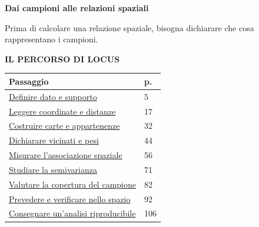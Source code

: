 \documentclass[12pt,aspectratio=1610]{beamer}
\newcommand{\PLabel}[1]{\par{\color{Classical}\bfseries\fontsize{9}{11}\selectfont\MakeUppercase{#1}}\par\vspace{1.8mm}}
\begin{document}
\begin{frame}[plain]\hypertarget{slide2}{}
\begin{lrbox}{\TitleBox}
\begin{minipage}[t]{17.7cm}\raggedright\color{Ink}\fontsize{11.3}{14.8}\selectfont
\color{Navy}\bfseries\fontsize{20.6}{24.5}\selectfont Dai campioni alle relazioni spaziali
\end{minipage}\end{lrbox}

\begin{lrbox}{\RecallBox}
\begin{minipage}[t]{14.3cm}\raggedright\color{Ink}\fontsize{11.3}{14.8}\selectfont
\fontsize{10.3}{13.8}\selectfont Prima di calcolare una relazione spaziale, bisogna dichiarare che cosa rappresentano i campioni.
\end{minipage}\end{lrbox}

\begin{lrbox}{\PilotLeftBox}
\begin{minipage}[t]{10.05cm}\raggedright\color{Ink}\fontsize{11.3}{14.8}\selectfont
\PLabel{Il percorso di Locus}
{\fontsize{10.2}{13.1}\selectfont\renewcommand{\arraystretch}{1.45}\begin{tabular}{@{}p{8.3cm}p{0.7cm}@{}}\toprule
\textbf{Passaggio} & \textbf{p.}\\\midrule
\hyperlink{slide5}{Definire dato e supporto} & 5\\
\hyperlink{slide17}{Leggere coordinate e distanze} & 17\\
\hyperlink{slide32}{Costruire carte e appartenenze} & 32\\
\hyperlink{slide44}{Dichiarare vicinati e pesi} & 44\\
\hyperlink{slide56}{Misurare l’associazione spaziale} & 56\\
\hyperlink{slide71}{Studiare la semivarianza} & 71\\
\hyperlink{slide82}{Valutare la copertura del campione} & 82\\
\hyperlink{slide92}{Prevedere e verificare nello spazio} & 92\\
\hyperlink{slide106}{Consegnare un’analisi riproducibile} & 106\\
\bottomrule\end{tabular}}


\end{minipage}
\end{lrbox}
\end{frame}
\end{document}
